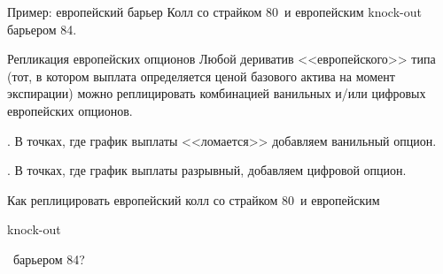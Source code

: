 \documentclass{beamer}
\newcommand{\en}[1]{\begin{otherlanguage}{english}#1\end{otherlanguage}}
\newcommand{\usdrubstrike}{80}
\newcommand{\usdrubbarrier}{84}
\begin{document}
\begin{frame}{Пример: европейский барьер}
\justify
Колл со страйком \usdrubstrike\ и европейским knock-out барьером \usdrubbarrier.

\centering
\end{frame}



\begin{frame}{Репликация европейских опционов}
\justify
Любой дериватив <<европейского>> типа (тот, в котором выплата определяется ценой 
базового актива на момент экспирации) можно реплицировать комбинацией ванильных и/или
цифровых европейских опционов.

. В точках, где график выплаты <<ломается>> добавляем ванильный опцион.

. В точках, где график выплаты разрывный, добавляем цифровой опцион.

\justify
Как реплицировать европейский колл со страйком \usdrubstrike\ и европейским \en{knock-out}\
барьером \usdrubbarrier?
\end{frame}
\end{document}
